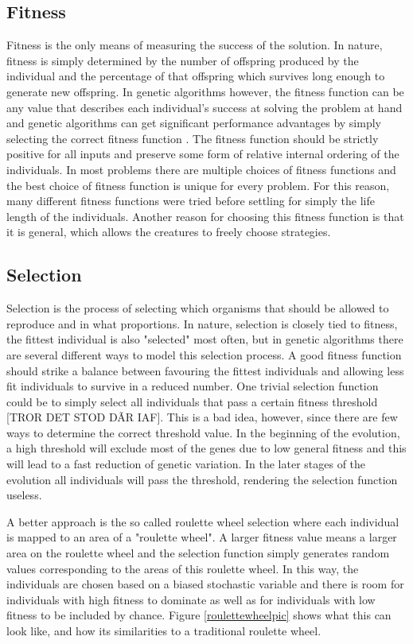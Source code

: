 \documentclass[a4paper,11pt]{kth-mag}
\begin{document}
\subsection{Fitness}
Fitness is the only means of measuring the success of the solution. In nature, fitness is simply determined by the number of offspring produced by the individual and the percentage of that offspring which survives long enough to generate new offspring. In genetic algorithms however, the fitness function can be any value that describes each individual's success at solving the problem at hand and genetic algorithms can get significant performance advantages by simply selecting the correct fitness function \cite{marsland}. The fitness function should be strictly positive for all inputs and preserve some form of relative internal ordering of the individuals. In most problems there are multiple choices of fitness functions and the best choice of fitness function is unique for every problem. For this reason, many different fitness functions were tried before settling for simply the life length of the individuals. Another reason for choosing this fitness function is that it is general, which allows the creatures to freely choose strategies.

\subsection{Selection}
Selection is the process of selecting which organisms that should be allowed to reproduce and in what proportions. In nature, selection is closely tied to fitness, the fittest individual is also "selected" most often, but in genetic algorithms there are several different ways to model this selection process. A good fitness function should strike a balance between favouring the fittest individuals and allowing less fit individuals to survive in a reduced number.  One trivial selection function could be to simply select all individuals that pass a certain fitness threshold \cite{marsland} [TROR DET STOD DÃR IAF]. This is a bad idea, however, since there are few ways to determine the correct threshold value. In the beginning of the evolution, a high threshold will exclude most of the genes due to low general fitness and this will lead to a fast reduction of genetic variation. In the later stages of the evolution all individuals will pass the threshold, rendering the selection function useless.

A better approach is the so called roulette wheel selection where each individual is mapped to an area of a "roulette wheel". A larger fitness value means a larger area on the roulette wheel and the selection function simply generates random values corresponding to the areas of this roulette wheel. In this way, the individuals are chosen based on a biased stochastic variable and there is room for individuals with high fitness to dominate as well as for individuals with low fitness to be included by chance. Figure \ref{roulettewheelpic} shows what this can look like, and how its similarities to a traditional roulette wheel.
\end{document}
